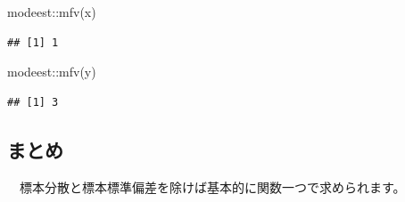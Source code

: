 \documentclass[
  12pt,
]{book}
\newenvironment{Shaded}{\begin{snugshade}}{\end{snugshade}}
\newcommand{\FunctionTok}[1]{\textcolor[rgb]{0.00,0.00,0.00}{#1}}
\newcommand{\NormalTok}[1]{#1}
\newcommand{\SpecialCharTok}[1]{\textcolor[rgb]{0.00,0.00,0.00}{#1}}
\begin{document}
\begin{Shaded}
\begin{Highlighting}[numbers=left,,]
\NormalTok{modeest}\SpecialCharTok{::}\FunctionTok{mfv}\NormalTok{(x)}
\end{Highlighting}
\end{Shaded}

\begin{verbatim}
## [1] 1
\end{verbatim}

\begin{Shaded}
\begin{Highlighting}[numbers=left,,]
\NormalTok{modeest}\SpecialCharTok{::}\FunctionTok{mfv}\NormalTok{(y)}
\end{Highlighting}
\end{Shaded}

\begin{verbatim}
## [1] 3
\end{verbatim}

\newpage

\hypertarget{ux307eux3068ux3081-1}{%
\subsection{まとめ}\label{ux307eux3068ux3081-1}}

　標本分散と標本標準偏差を除けば基本的に関数一つで求められます。
\end{document}
